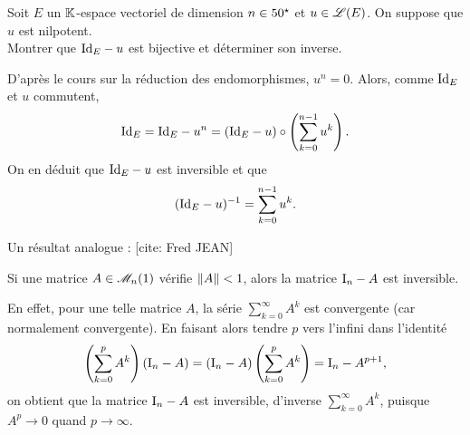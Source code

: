 \begin{exercice}
    Soit $E$ un $\mathbb{K}$-espace vectoriel de dimension $n \in 50^\star$ et $u \in \mathscr{L}(E)$. On suppose que $u$ est nilpotent. \\
    Montrer que $\mathrm{Id}_E - u$ est bijective et déterminer son inverse.
\end{exercice}


\begin{solution}
    D'après le cours sur la réduction des endomorphismes, $u^n = 0$. Alors, comme $\mathrm{Id}_E$ et $u$ commutent, 
    $$\mathrm{Id}_E = \mathrm{Id}_E - u^n = (\mathrm{Id}_E - u) \circ \left( \sum_{k = 0}^{n-1} u^k \right).$$
    On en déduit que $\mathrm{Id}_E - u$ est inversible et que 
    $$(\mathrm{Id}_E - u)^{-1} = \sum_{k = 0}^{n-1} u^k.$$
\end{solution}

Un résultat analogue : [cite: Fred JEAN]\\
\begin{prop}
    Si une matrice $A \in \mathscr{M}_n(1)$ vérifie $\Vert A \Vert < 1$, alors la matrice $\mathrm{I}_n - A$ est inversible. 
\end{prop}

\begin{demo}
    En effet, pour une telle matrice $A$, la série $\sum\limits_{k=0}^\infty A^k$ est convergente (car normalement convergente). En faisant alors tendre $p$ vers l'infini dans l'identité
    $$\left( \sum_{k=0}^p A^k \right) (\mathrm{I}_n - A) = (\mathrm{I}_n - A) \left( \sum_{k=0}^p A^k \right) = \mathrm{I}_n - A^{p+1},$$
    on obtient que la matrice $\mathrm{I}_n - A$ est inversible, d'inverse $\sum\limits_{k=0}^\infty A^k$, puisque $A^p \to 0$ quand $p \to \infty$.
\end{demo}
